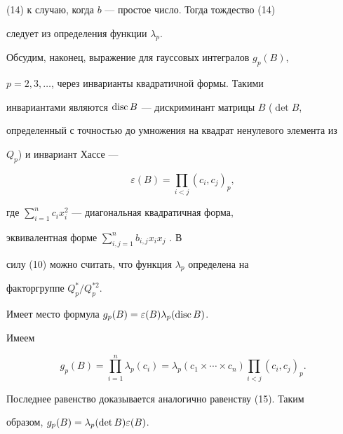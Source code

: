 (14) к случаю, когда $b$ --- простое число. Тогда тождество (14) 


следует из определения функции $\lambda_p$. 


 


Обсудим, наконец, выражение для гауссовых интегралов $g_p(B)$, 


$p=2,3,\dotsc$, через инварианты квадратичной формы. Такими 


инвариантами являются $\operatorname{disc} B$ --- дискриминант матрицы $B$ ($\det B$, 


определенный с точностью до умножения на квадрат ненулевого элемента из 


$Q_p$) и инвариант Хассе --- 


$$ 


\varepsilon(B)=\prod_{i<j}(c_i,c_j)_p, 


$$ 


где $\sum\limits^n_{i=1}c_i x^2_i$ --- диагональная квадратичная форма, 


эквивалентная форме $\sum\limits^n_{i,j=1}b_{i,j}x_i x_j$ \cite{4}. В 


силу (10) можно считать, что функция $\lambda_p$ определена на 


факторгруппе $Q^*_p/Q^{*2}_p$. 


 


\begin{thm} 


Имеет место формула $g_p(B)=\varepsilon(B)\lambda_p(\operatorname{disc} B)$. 


\end{thm} 


 


\begin{pf} 


Имеем 


$$ 


g_p(B)=\prod^n_{i=1}\lambda_p(c_i)= 


\lambda_p(c_1\times\dotsb\times c_n) 


\prod_{i<j}(c_i,c_j)_p. 


$$ 


Последнее равенство доказывается аналогично равенству (15). Таким 


образом, $g_p(B)=\linebreak \lambda_p(\det B)\varepsilon(B)$. 


\end{pf} 


